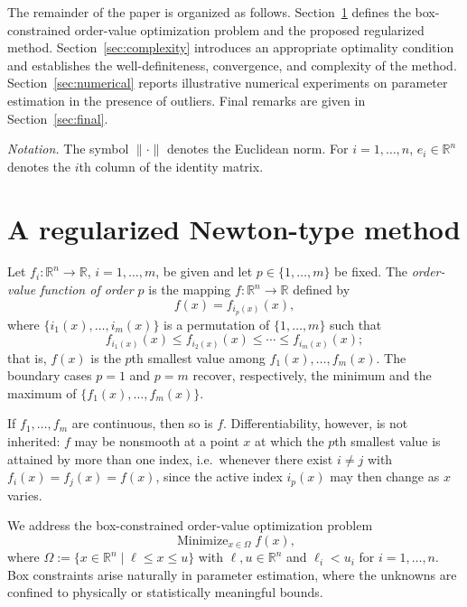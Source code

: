 \documentclass[11pt]{article}
\newcommand{\minimize}{\mathop{\text{Minimize}}}
\begin{document}
The remainder of the paper is organized as follows. Section~\ref{sec:method}
defines the box-constrained order-value optimization problem and the proposed
regularized method. Section~\ref{sec:complexity} introduces an appropriate
optimality condition and establishes the well-definiteness, convergence, and
complexity of the method. Section~\ref{sec:numerical} reports illustrative
numerical experiments on parameter estimation in the presence of outliers.
Final remarks are given in Section~\ref{sec:final}.

\medskip
\noindent\textit{Notation.} The symbol $\|\cdot\|$ denotes the Euclidean norm.
For $i=1,\dots,n$, $e_i\in\mathbb{R}^{n}$ denotes the $i$th column of the
identity matrix.

\section{A regularized Newton-type method} \label{sec:method}

Let $f_i : \mathbb{R}^n \to \mathbb{R}$, $i = 1, \ldots, m$, be given and let
$p \in \{1, \ldots, m\}$ be fixed. The \textit{order-value function of order
$p$} is the mapping $f : \mathbb{R}^n \to \mathbb{R}$ defined by
\begin{equation}
    f(x) = f_{i_p(x)}(x), \label{ovo-function}
\end{equation}
where $\{i_1(x), \ldots, i_m(x)\}$ is a permutation of $\{1, \ldots, m\}$ such
that
\begin{equation}
    f_{i_1(x)}(x) \leq f_{i_2(x)}(x) \leq \cdots \leq f_{i_m(x)}(x);
    \label{fi-sort}
\end{equation}
that is, $f(x)$ is the $p$th smallest value among $f_1(x), \ldots, f_m(x)$.
The boundary cases $p = 1$ and $p = m$ recover, respectively, the minimum and
the maximum of $\{f_1(x), \ldots, f_m(x)\}$.

If $f_1, \ldots, f_m$ are continuous, then so is $f$. Differentiability,
however, is not inherited: $f$ may be nonsmooth at a point $x$ at which the
$p$th smallest value is attained by more than one index, i.e.\ whenever there
exist $i \neq j$ with $f_i(x) = f_j(x) = f(x)$, since the active index $i_p(x)$
may then change as $x$ varies.

We address the box-constrained order-value optimization problem
\begin{equation}
    \minimize_{x \in \Omega} f(x), \label{ovo-problem}
\end{equation}
where $\Omega := \{x \in \mathbb{R}^n \mid \ell \leq x \leq u\}$ with
$\ell, u \in \mathbb{R}^n$ and $\ell_i < u_i$ for $i = 1, \ldots, n$. Box
constraints arise naturally in parameter estimation, where the unknowns are
confined to physically or statistically meaningful bounds.
\end{document}
